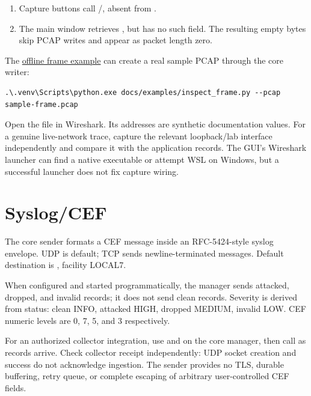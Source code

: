 \begin{enumerate}
\item Capture buttons call /, absent from .
\item The main window retrieves , but  has no such field. The resulting empty bytes skip PCAP writes and appear as packet length zero.
\end{enumerate}

\par\noindent\begin{minipage}{\linewidth}
The \hyperref[reference-files]{offline frame example} can create a real sample PCAP through the core writer:
\begin{lstlisting}[title={POWERSHELL}]
.\.venv\Scripts\python.exe docs/examples/inspect_frame.py --pcap sample-frame.pcap
\end{lstlisting}
\end{minipage}\par
Open the file in Wireshark. Its addresses are synthetic documentation values. For a genuine live-network trace, capture the relevant loopback/lab interface independently and compare it with the application records. The GUI's Wireshark launcher can find a native executable or attempt WSL on Windows, but a successful launcher does not fix capture wiring.

\section*{Syslog/CEF}
The core sender formats a CEF message inside an RFC-5424-style syslog envelope. UDP is default; TCP sends newline-terminated messages. Default destination is , facility LOCAL7.

When configured and started programmatically, the manager sends attacked, dropped, and invalid records; it does not send clean records. Severity is derived from status: clean INFO, attacked HIGH, dropped MEDIUM, invalid LOW. CEF numeric levels are 0, 7, 5, and 3 respectively.

For an authorized collector integration, use  and  on the core manager, then call  as records arrive. Check collector receipt independently: UDP socket creation and  success do not acknowledge ingestion. The sender provides no TLS, durable buffering, retry queue, or complete escaping of arbitrary user-controlled CEF fields.

